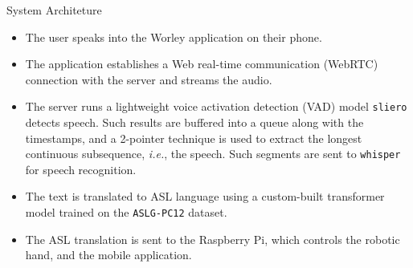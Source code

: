 \documentclass[final, 20pt]{beamer}
\def\ie{\textit{i.e.}\xspace}
\newlength{\colwidth}
\begin{document}
\begin{frame}[t]
\begin{columns}[t]
\begin{column}{\colwidth}
\begin{block}{System Architeture}
        \begin{itemize}
          \item The user speaks into the Worley application on their phone.
          \item The application establishes a Web real-time communication (WebRTC) connection with the server and streams the audio.
          \item The server runs a lightweight voice activation detection (VAD) model \texttt{sliero} detects speech. Such results are buffered into a queue along with the timestamps, and a 2-pointer technique is used to extract the longest continuous subsequence, \ie, the speech. Such segments are sent to \texttt{whisper} for speech recognition.
          \item The text is translated to ASL language using a custom-built transformer model trained on the \texttt{ASLG-PC12} dataset.
          \item The ASL translation is sent to the Raspberry Pi, which controls the robotic hand, and the mobile application.
        \end{itemize}
      \end{block}
    \end{column}

    \margincolumn
  \end{columns}

\end{frame}
\end{document}
